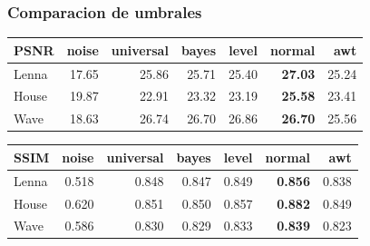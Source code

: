 \documentclass{beamer}
\begin{document}
  \begin{frame}
    \frametitle{ Comparacion de umbrales }
    \centering
    \begin{tabular}{lrrrrrr}
      \toprule
      {PSNR} &  noise &  universal &  bayes &  level &  normal &    awt \\
      \midrule
      Lenna &  17.65 &      25.86 &  25.71 &  25.40 &   \bf{27.03} &  25.24 \\
      House &  19.87 &      22.91 &  23.32 &  23.19 &   \bf{25.58} &  23.41 \\
      Wave &  18.63 &      26.74 &  26.70 &  26.86 &   \bf{26.70} &  25.56 \\
      \bottomrule
      \end{tabular}
      \begin{tabular}{lrrrrrr}
        {SSIM} &  noise &  universal &  bayes &  level &  normal &    awt \\
        \midrule
        Lenna &  0.518 &   0.848 &  0.847 &  0.849 &  \bf{0.856} &  0.838 \\
        House &  0.620 &   0.851 &  0.850 &  0.857 &  \bf{0.882} &  0.849 \\
        Wave &  0.586 &   0.830 &  0.829 &  0.833 &  \bf{0.839} &  0.823 \\
        \bottomrule
        \end{tabular}



  \end{frame}
\end{document}
